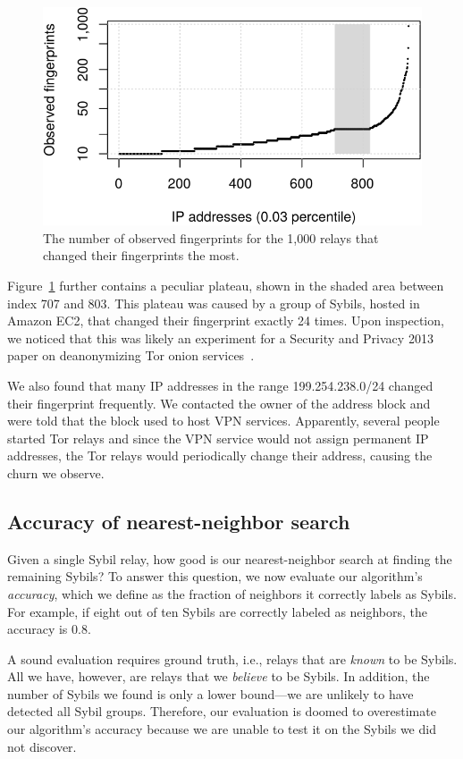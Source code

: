 \begin{figure}[t]
	\centering
	\includegraphics[width=0.9\linewidth]{diagrams/fingerprints.pdf}
	\caption{The number of observed fingerprints for the 1,000 relays that
	changed their fingerprints the most.}
	\label{fig:fingerprints}
\end{figure}

Figure~\ref{fig:fingerprints} further contains a peculiar plateau, shown in the
shaded area between index 707 and 803.  This plateau was caused by a group of
Sybils, hosted in Amazon EC2, that changed their fingerprint exactly 24 times.
Upon inspection, we noticed that this was likely an experiment for a Security
and Privacy 2013 paper on deanonymizing Tor onion services~\cite{Biryukov2013a}.

We also found that many IP addresses in the range 199.254.238.0/24 changed their
fingerprint frequently.  We contacted the owner of the address block and were
told that the block used to host VPN services.  Apparently, several people
started Tor relays and since the VPN service would not assign permanent IP
addresses, the Tor relays would periodically change their address, causing the
churn we observe.

\subsection{Accuracy of nearest-neighbor search}
\label{sec:accuracy}
Given a single Sybil relay, how good is our nearest-neighbor search at finding
the remaining Sybils?  To answer this question, we now evaluate our algorithm's
\emph{accuracy}, which we define as the fraction of neighbors it correctly
labels as Sybils.  For example, if eight out of ten Sybils are correctly labeled
as neighbors, the accuracy is 0.8.

A sound evaluation requires ground truth, i.e., relays that are \emph{known} to
be Sybils.  All we have, however, are relays that we \emph{believe} to be
Sybils.  In addition, the number of Sybils we found is only a lower bound---we
are unlikely to have detected all Sybil groups.  Therefore, our evaluation is
doomed to overestimate our algorithm's accuracy because we are unable to test it
on the Sybils we did not discover.

